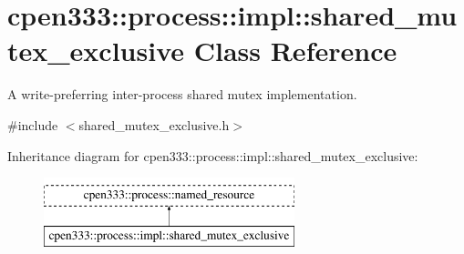 \hypertarget{classcpen333_1_1process_1_1impl_1_1shared__mutex__exclusive}{}\section{cpen333\+:\+:process\+:\+:impl\+:\+:shared\+\_\+mutex\+\_\+exclusive Class Reference}
\label{classcpen333_1_1process_1_1impl_1_1shared__mutex__exclusive}


A write-\/preferring inter-\/process shared mutex implementation.  




{\ttfamily \#include $<$shared\+\_\+mutex\+\_\+exclusive.\+h$>$}

Inheritance diagram for cpen333\+:\+:process\+:\+:impl\+:\+:shared\+\_\+mutex\+\_\+exclusive\+:\begin{figure}[H]
\begin{center}
\leavevmode
\includegraphics[height=2.000000cm]{classcpen333_1_1process_1_1impl_1_1shared__mutex__exclusive}
\end{center}
\end{figure}
